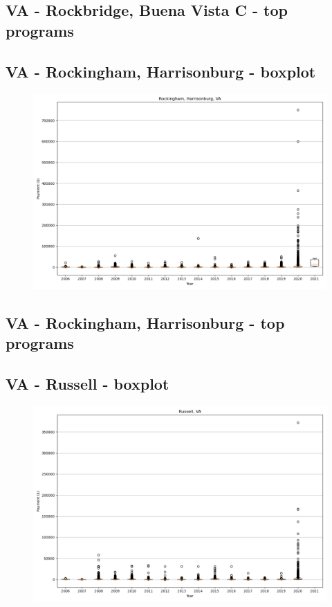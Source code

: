 \subsection*{VA - Rockbridge, Buena Vista C - top programs}

\newpage
\subsection*{VA - Rockingham, Harrisonburg - boxplot}
\begin{figure}[h]
\centering
\includegraphics[width=7in]{../output/boxplots/counties/Rockingham, Harrisonburg-VA_boxplot.png}
\end{figure}


\subsection*{VA - Rockingham, Harrisonburg - top programs}

\newpage
\subsection*{VA - Russell - boxplot}
\begin{figure}[h]
\centering
\includegraphics[width=7in]{../output/boxplots/counties/Russell-VA_boxplot.png}
\end{figure}


